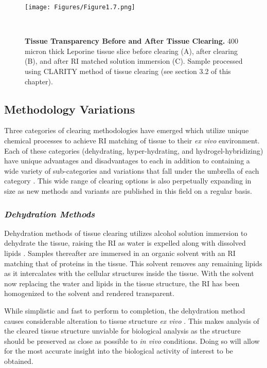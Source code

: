 \begin{figure}[H]
    \centering
    \texttt{[image: Figures/Figure1.7.png]}
    \caption{\textbf{Tissue Transparency Before and After Tissue Clearing.} 400 micron thick Leporine tissue slice before clearing (A), after clearing (B), and after RI matched solution immersion (C). Sample processed using CLARITY method of tissue clearing (see section 3.2 of this chapter).}
    \label{fig:enter-label}\
\end{figure}

\subsection{Methodology Variations}


Three categories of clearing methodologies have emerged which utilize unique chemical processes to achieve RI matching of tissue to their \textit{ex vivo} environment. Each of these categories (dehydrating, hyper-hydrating, and hydrogel-hybridizing) have unique advantages and disadvantages to each in addition to containing a wide variety of sub-categories and variations that fall under the umbrella of each category \cite{paysan_art_2023}. This wide range of clearing options is also perpetually expanding in size as new methods and variants are published in this field on a regular basis. 

\subsubsection{\textit{Dehydration Methods}}
Dehydration methods of tissue clearing utilizes alcohol solution immersion to dehydrate the tissue, raising the RI as water is expelled along with dissolved lipids \cite{paysan_art_2023}. Samples thereafter are immersed in an organic solvent with an RI matching that of proteins in the tissue. This solvent removes any remaining lipids as it intercalates with the cellular structures inside the tissue. With the solvent now replacing the water and lipids in the tissue structure, the RI has been homogenized to the solvent and rendered transparent. 

While simplistic and fast to perform to completion, the dehydration method causes considerable alteration to tissue structure \textit{ex vivo} \cite{olianti_optical_2021}. This makes analysis of the cleared tissue structure unviable for biological analysis as the structure should be preserved as close as possible to \textit{in vivo} conditions. Doing so will allow for the most accurate insight into the biological activity of interest to be obtained.

